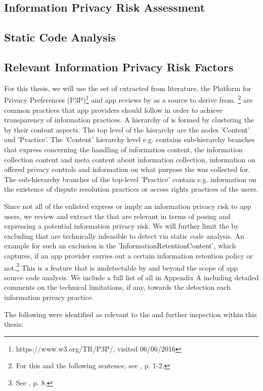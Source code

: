 \subsection{Information Privacy Risk Assessment}

\subsection{Static Code Analysis}

\subsection{Relevant Information Privacy Risk Factors}


For this thesis, we will use the set of \ipp extracted from literature, the Platform for Privacy Preferences (\acs{P3P})\footnote{https://www.w3.org/TR/P3P/, visited 06/06/2016} and app reviews by \cite{Dehling2016} as a source to derive \iprfs from. \footnote{For this and the following sentence, see \cite{Dehling2016}, p. 1-2.} 
\Ipp are common practices that app providers should follow in order to achieve transparency of information practices.
A hierarchy of \ipp is formed by clustering the \ipp by their content aspects. 
The top level of the hierarchy are the nodes 'Content' and 'Practice'.
The 'Content' hierarchy level e.g. contains sub-hierarchy branches that express \ipp concerning the handling of information content, the information collection content and meta content about information collection, information on offered privacy controls and information on what purpose the \ipp was collected for.
The sub-hierarchy branches of the top-level 'Practice' contain e.g. information on the existence of dispute resolution practices or access rights practices of the users.

Since not all of the enlisted \ipp express or imply an information privacy risk to app users, we review and extract the \ipp that are relevant in terms of posing and expressing a potential information privacy risk.
We will further limit the \ipp by excluding \ipp that are technically infeasible to detect via static code analysis.
An example for such an exclusion is the \ipp 'InformationRetentionContent', which captures, if an app provider carries out a certain information retention policy or not.\footnote{See \cite{Dehling2016}, p. 8.}
This is a feature that is undetectable by \sca and beyond the scope of app source code analysis.
We include a full list of all \ipp in Appendix A including detailed comments on the technical limitations, if any, towards the \sca detection each information privacy practice.

The following \ipp were identified as relevant to the \sca and further inspection within this thesis:

